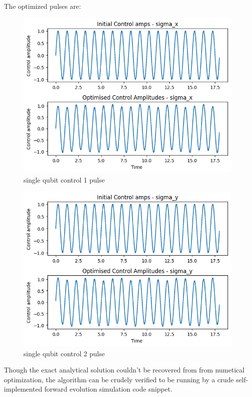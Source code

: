 \documentclass[12pt]{report}
\begin{document}
The optimized pulses are: 
\begin{figure}[H]
    \centering
    \includegraphics[width=0.95\linewidth]{single_qubit_control1.png}
    \caption{single qubit control 1 pulse}
    \label{fig:single_qubit_control1}
\end{figure}
\begin{figure}[H]
    \centering
    \includegraphics[width=0.95\linewidth]{single_qubit_control2.png}
    \caption{single qubit control 2 pulse}
    \label{fig:single_qubit_control2}
\end{figure}

Though the exact analytical solution couldn't be recovered from from numetical optimization, 
the algorithm can be crudely verified to be running by a crude self-implemented forward 
evolution simulation code snippet. 
\end{document}
